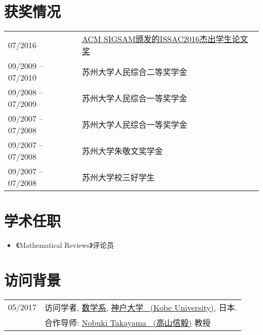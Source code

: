 \documentclass[a4paper,12pt]{article}
\begin{document}
\begin{CJK*}{UTF8}{gbsn}
\section*{\Large{获奖情况}}
\begin{tabular}{@{}p{1.4in}p{4in}}
07/2016               & \href{https://www.sigsam.org/Awards/ISSACAwards.html}{ACM SIGSAM颁发的ISSAC2016杰出学生论文奖} \\
09/2009 -- 07/2010    & 苏州大学人民综合二等奖学金\\
09/2008 -- 07/2009    & 苏州大学人民综合一等奖学金 \\
09/2007 -- 07/2008    & 苏州大学人民综合一等奖学金 \\ 
09/2007 -- 07/2008    & 苏州大学朱敬文奖学金 \\
09/2007 -- 07/2008    & 苏州大学校三好学生
\end{tabular}

\section*{学术任职}
\begin{itemize}
 \item 《Mathematical Reviews》评论员
\end{itemize}

\section*{\Large{访问背景}}
\begin{tabular}{@{}p{1.0in}p{4.5in}}
05/2017               & 访问学者, 
                        \href{http://www.math.kobe-u.ac.jp/}{数学系},
                        \href{http://www.kobe-u.ac.jp/en/}{神户大学 \ (Kobe University)}, 日本. \\                       
                        & 合作导师: \href{http://www.math.kobe-u.ac.jp/home-j/takayama-e.html}{Nobuki Takayama \ (高山信毅)} 教授\\
\end{tabular}



\end{CJK*}
\end{document}
